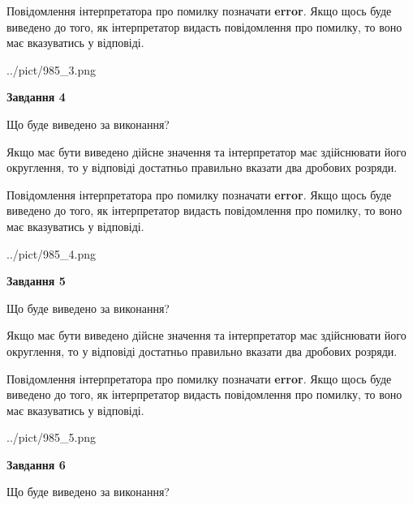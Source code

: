 \documentclass[12pt, ukrainian]{article}
\begin{document}
{\begin {Large}
Повідомлення інтерпретатора про помилку позначати \textbf{error}.
Якщо щось буде виведено до того, як інтерпретатор видасть повідомлення про помилку, 
то воно має вказуватись у відповіді. \par

\begin{center}
	{../pict/985_3.png}
\end{center}
\newpage

{\begin {center}\textbf{Завдання 4}\end {center}}\par
Що буде виведено за виконання? \par

Якщо має бути виведено дійсне значення та інтерпретатор має здійснювати його округлення, 
то у відповіді достатньо правильно вказати два дробових розряди.

Повідомлення інтерпретатора про помилку позначати \textbf{error}.
Якщо щось буде виведено до того, як інтерпретатор видасть повідомлення про помилку, 
то воно має вказуватись у відповіді. \par

\begin{center}
	{../pict/985_4.png}
\end{center}
\newpage

{\begin {center}\textbf{Завдання 5}\end {center}}\par
Що буде виведено за виконання? \par

Якщо має бути виведено дійсне значення та інтерпретатор має здійснювати його округлення, 
то у відповіді достатньо правильно вказати два дробових розряди.

Повідомлення інтерпретатора про помилку позначати \textbf{error}.
Якщо щось буде виведено до того, як інтерпретатор видасть повідомлення про помилку, 
то воно має вказуватись у відповіді. \par

\begin{center}
	{../pict/985_5.png}
\end{center}
\newpage

{\begin {center}\textbf{Завдання 6}\end {center}}\par
Що буде виведено за виконання? \par


\end{Large}}
\end{document}
